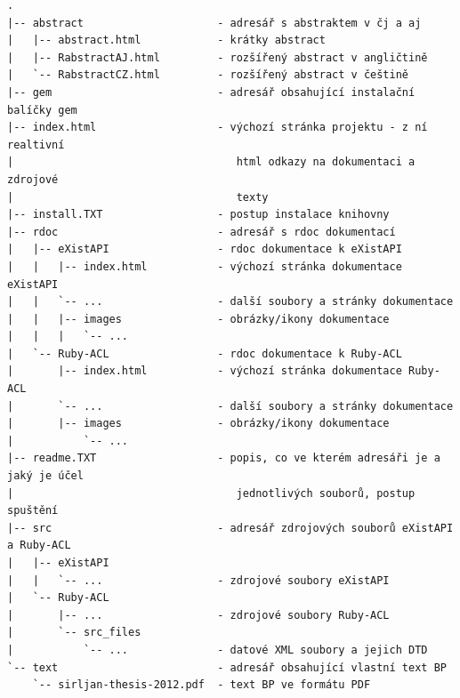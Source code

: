 \documentclass[11pt,twoside,a4paper]{book}
\begin{document}
\begin{verbatim}
.
|-- abstract                     - adresář s abstraktem v čj a aj
|   |-- abstract.html            - krátky abstract
|   |-- RabstractAJ.html         - rozšířený abstract v angličtině
|   `-- RabstractCZ.html         - rozšířený abstract v češtině
|-- gem                          - adresář obsahující instalační balíčky gem
|-- index.html                   - výchozí stránka projektu - z ní realtivní 
|                                   html odkazy na dokumentaci a zdrojové 
|                                   texty
|-- install.TXT                  - postup instalace knihovny
|-- rdoc                         - adresář s rdoc dokumentací
|   |-- eXistAPI                 - rdoc dokumentace k eXistAPI
|   |   |-- index.html           - výchozí stránka dokumentace eXistAPI  
|   |   `-- ...                  - další soubory a stránky dokumentace
|   |   |-- images               - obrázky/ikony dokumentace
|   |   |   `-- ...
|   `-- Ruby-ACL                 - rdoc dokumentace k Ruby-ACL
|       |-- index.html           - výchozí stránka dokumentace Ruby-ACL 
|       `-- ...                  - další soubory a stránky dokumentace
|       |-- images               - obrázky/ikony dokumentace
|           `-- ...
|-- readme.TXT                   - popis, co ve kterém adresáři je a jaký je účel 
|                                   jednotlivých souborů, postup spuštění
|-- src                          - adresář zdrojových souborů eXistAPI a Ruby-ACL
|   |-- eXistAPI
|   |   `-- ...                  - zdrojové soubory eXistAPI
|   `-- Ruby-ACL                        
|       |-- ...                  - zdrojové soubory Ruby-ACL
|       `-- src_files                   
|           `-- ...              - datové XML soubory a jejich DTD
`-- text                         - adresář obsahující vlastní text BP
    `-- sirljan-thesis-2012.pdf  - text BP ve formátu PDF
\end{verbatim}
\end{document}
